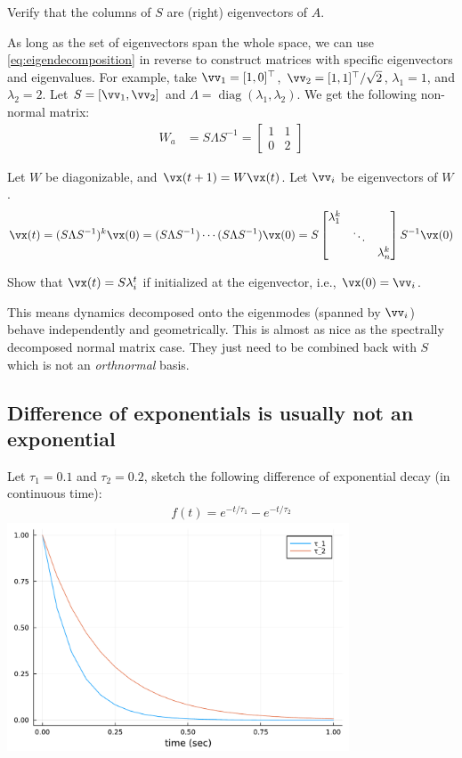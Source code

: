 \documentclass[a4paper,11pt]{exam}
\newcounter{ct}
\newcommand{\inv}{^{-1}}
\newcommand{\trp}{{^\top}} %
\DeclareMathOperator*{\diag}{diag}
\begin{document}
\begin{questions}
\question Verify that the columns of $S$ are (right) eigenvectors of $A$.

As long as the set of eigenvectors span the whole space, we can use \eqref{eq:eigendecomposition} in reverse to construct matrices with specific eigenvectors and eigenvalues.
For example, take $\vv_1 = [1, 0]\trp$, $\vv_2 = [1, 1]\trp / \sqrt{2}$, $\lambda_1 = 1$, and $\lambda_2 = 2$.
Let $S = [\vv_1, \vv_2]$ and $\Lambda = \diag(\lambda_1, \lambda_2)$.
We get the following non-normal matrix:
\begin{align}\label{eq:nnm:ex:a}
W_a &= S \Lambda S\inv =
\begin{bmatrix}
1 & 1\\
0 & 2
\end{bmatrix}
\end{align}

Let $W$ be diagonizable, and $\vx(t+1) = W\vx(t)$. Let $\vv_i$ be eigenvectors of $W$.
\begin{align}
	\vx(t) =
	(S \Lambda S\inv)^k \vx(0) =
	(S \Lambda S\inv) \cdots
	(S \Lambda S\inv) \vx(0)
	=
	S \begin{bmatrix}
	\lambda_1^k & &\\
	& \ddots & \\
	& & \lambda_n^k
	\end{bmatrix}
	S\inv \vx(0)
\end{align}

\clearpage
\question Show that $\vx(t) = S\lambda_i^t$ if initialized at the eigenvector, i.e., $\vx(0) = \vv_i$.

This means dynamics decomposed onto the eigenmodes (spanned by $\vv_i$) behave independently and geometrically.
This is almost as nice as the spectrally decomposed normal matrix case.
They just need to be combined back with $S$ which is not an \emph{orthnormal} basis.


\subsection{Difference of exponentials is usually not an exponential}
\question Let $\tau_1 = 0.1$ and $\tau_2 = 0.2$, sketch the following difference of exponential decay (in continuous time):
\begin{align}\label{eq:diff_ex:eg}
    f(t) = e^{-t/\tau_1} - e^{-t/\tau_2}
\end{align}
\includegraphics[width=4in]{diff_exp_decay}


\end{questions}
\end{document}
